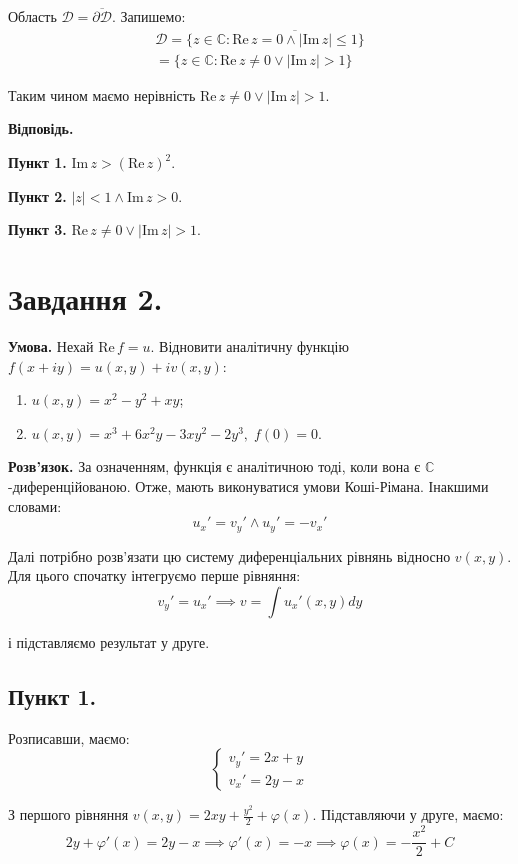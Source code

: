 \documentclass[14pt]{extarticle}
\begin{document}
Область $\mathcal{D} = \overline{\partial\mathcal{D}}$. Запишемо:
\begin{align*}
\mathcal{D} = \{z \in \mathbb{C}: \overline{\text{Re}\, z = 0 \wedge |\text{Im}\, z| \leq 1}\}  \\
=\{z \in \mathbb{C}: \text{Re} \, z \neq 0 \vee |\text{Im} \, z| > 1\}
\end{align*}

Таким чином маємо нерівність $\text{Re}\, z \neq 0 \vee |\text{Im}\, z| > 1$. 

\textbf{Відповідь.}

\textbf{Пункт 1.} $\text{Im}\, z > (\text{Re}\,z)^2$.

\textbf{Пункт 2.} $|z|<1 \wedge \text{Im}\, z > 0$.

\textbf{Пункт 3.} $\text{Re}\, z \neq 0 \vee |\text{Im}\, z| > 1$.

\section*{Завдання 2.} 

\textbf{Умова.} Нехай $\text{Re}\, f=u$. Відновити аналітичну функцію $f(x+iy)=u(x,y)+iv(x,y)$:
\begin{enumerate}
    \item $u(x,y)=x^2-y^2+xy$;
    \item $u(x,y)=x^3+6x^2y-3xy^2-2y^3, \; f(0)=0$.
\end{enumerate}

\textbf{Розв'язок.} За означенням, функція є аналітичною тоді, коли вона є $\mathbb{C}$-диференційованою. Отже, мають виконуватися умови Коші-Рімана. Інакшими словами:
\[
u_x' = v_y' \wedge u_y' = -v_x'
\]

Далі потрібно розв'язати цю систему диференціальних рівнянь відносно $v(x,y)$. Для цього спочатку інтегруємо перше рівняння:
\[
v_y' = u_x' \implies v = \int u_x'(x,y)dy
\]

і підставляємо результат у друге.

\subsection*{Пункт 1.} 

Розписавши, маємо:
\[
\begin{cases}
    v_y' = 2x+y \\
    v_x' = 2y-x
\end{cases}
\]

З першого рівняння $v(x,y) = 2xy + \frac{y^2}{2} + \varphi(x)$. Підставляючи у друге, маємо:
\[
2y + \varphi'(x) = 2y - x \implies \varphi'(x) = -x \implies \varphi(x) = -\frac{x^2}{2}+C
\]
\end{document}
